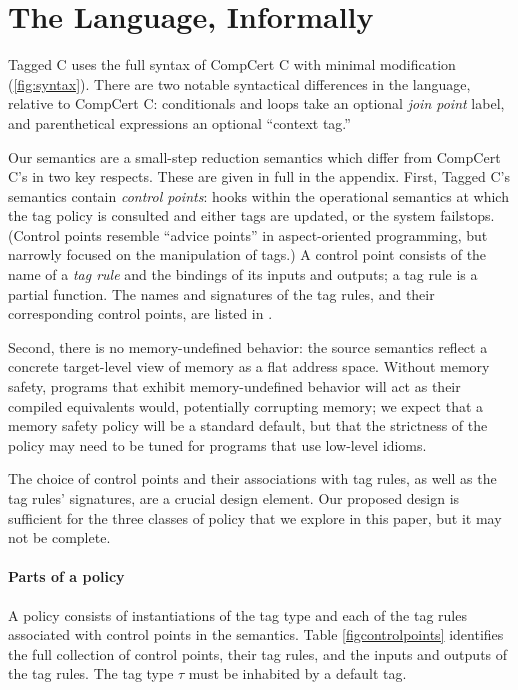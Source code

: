 \documentclass{llncs}
\begin{document}
\section{The Language, Informally}
\label{sec:language}

Tagged C uses the full syntax of CompCert C \cite{Leroy09:CompCert} with minimal modification (\cref{fig:syntax}).
There are two notable syntactical differences in the language, relative to CompCert C:
conditionals and loops take an optional {\em join point} label, and parenthetical expressions
an optional ``context tag.''

Our semantics are a small-step reduction semantics which differ from CompCert C's in
two key respects. These are given in full in the appendix. First, Tagged C's semantics contain
{\em control points}: hooks within the
operational semantics at which the tag policy is consulted and either tags are updated, or the system
failstops. (Control points resemble ``advice points'' in aspect-oriented programming, but narrowly
focused on the manipulation of tags.) A control point consists of the name of a {\em tag rule}
and the bindings of its inputs and outputs; a tag rule is a partial function. The names and
signatures of the tag rules, and their corresponding control points, are listed in .

Second, there is no memory-undefined behavior: the source semantics reflect a
concrete target-level view of memory as a flat address space. Without memory safety, programs
that exhibit memory-undefined behavior will act as their compiled equivalents would, potentially
corrupting memory; we expect that a memory safety policy will be a standard default, but that the
strictness of the policy may need to be tuned for programs that use low-level idioms.

The choice of control points and their associations with tag rules, as well as the tag rules'
signatures, are a crucial design element. Our proposed design is sufficient for the three classes of
policy that we explore in this paper, but it may not be complete.

\paragraph*{Parts of a policy}

A policy consists of instantiations of the tag type
and each of the tag rules associated with control points in the semantics. Table \cref{figcontrolpoints}
identifies the full collection of control points, their tag rules, and the inputs and outputs of the tag rules.
The tag type \(\tau\) must be inhabited by a default tag.
\end{document}

